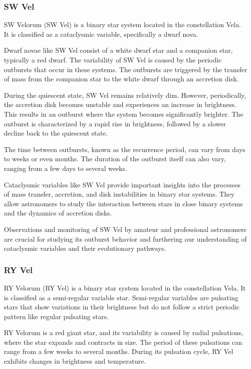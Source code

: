 \subsubsection*{ SW Vel }
SW Velorum (SW Vel) is a binary star system located in the constellation Vela. It is classified as a cataclysmic variable, specifically a dwarf nova.

Dwarf novae like SW Vel consist of a white dwarf star and a companion star, typically a red dwarf. The variability of SW Vel is caused by the periodic outbursts that occur in these systems. The outbursts are triggered by the transfer of mass from the companion star to the white dwarf through an accretion disk.

During the quiescent state, SW Vel remains relatively dim. However, periodically, the accretion disk becomes unstable and experiences an increase in brightness. This results in an outburst where the system becomes significantly brighter. The outburst is characterized by a rapid rise in brightness, followed by a slower decline back to the quiescent state.

The time between outbursts, known as the recurrence period, can vary from days to weeks or even months. The duration of the outburst itself can also vary, ranging from a few days to several weeks.

Cataclysmic variables like SW Vel provide important insights into the processes of mass transfer, accretion, and disk instabilities in binary star systems. They allow astronomers to study the interaction between stars in close binary systems and the dynamics of accretion disks.

Observations and monitoring of SW Vel by amateur and professional astronomers are crucial for studying its outburst behavior and furthering our understanding of cataclysmic variables and their evolutionary pathways.


\subsubsection*{ RY Vel }
RY Velorum (RY Vel) is a binary star system located in the constellation Vela. It is classified as a semi-regular variable star. Semi-regular variables are pulsating stars that show variations in their brightness but do not follow a strict periodic pattern like regular pulsating stars.

RY Velorum is a red giant star, and its variability is caused by radial pulsations, where the star expands and contracts in size. The period of these pulsations can range from a few weeks to several months. During its pulsation cycle, RY Vel exhibits changes in brightness and temperature.

